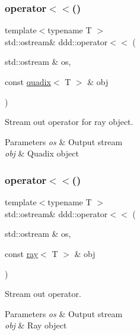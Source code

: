 \subsubsection{\texorpdfstring{operator$<$$<$()}{operator<<()}\hspace{0.1cm}{\footnotesize\ttfamily [7/10]}}
{\footnotesize\ttfamily template$<$typename T $>$ \\
std\+::ostream\& ddd\+::operator$<$$<$ (\begin{DoxyParamCaption}\item[{std\+::ostream \&}]{os,  }\item[{const \hyperlink{classddd_1_1quadix}{quadix}$<$ T $>$ \&}]{obj }\end{DoxyParamCaption})\hspace{0.3cm}{\ttfamily [inline]}}



Stream out operator for ray object. 


\begin{DoxyParams}{Parameters}
{\em os} & Output stream \\
\hline
{\em obj} & Quadix object \\
\hline
\end{DoxyParams}
\mbox{\label{namespaceddd_ae2604d6c72853dfb2595f6882cbc7a51}} 
\subsubsection{\texorpdfstring{operator$<$$<$()}{operator<<()}\hspace{0.1cm}{\footnotesize\ttfamily [8/10]}}
{\footnotesize\ttfamily template$<$typename T $>$ \\
std\+::ostream\& ddd\+::operator$<$$<$ (\begin{DoxyParamCaption}\item[{std\+::ostream \&}]{os,  }\item[{const \hyperlink{classddd_1_1ray}{ray}$<$ T $>$ \&}]{obj }\end{DoxyParamCaption})\hspace{0.3cm}{\ttfamily [inline]}}



Stream out operator. 


\begin{DoxyParams}{Parameters}
{\em os} & Output stream \\
\hline
{\em obj} & Ray object \\
\hline
\end{DoxyParams}
\mbox{\label{namespaceddd_af1faa02295670c7cfd7f0278e3973f84}} 
